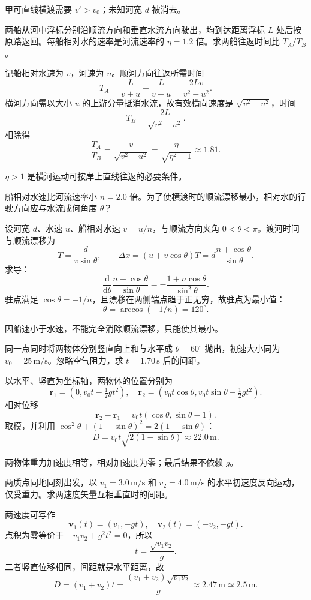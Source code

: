 \excheck
甲可直线横渡需要 $v'>v_0$；未知河宽 $d$ 被消去。


两船从河中浮标分别沿顺流方向和垂直水流方向驶出，均到达距离浮标 $L$ 处后按原路返回。每船相对水的速率是河流速率的 $\eta=1.2$ 倍。求两船往返时间比 $T_A/T_B$。

\exsolution
记船相对水速为 $v$，河速为 $u$。顺河方向往返所需时间
\[
T_A=\frac{L}{v+u}+\frac{L}{v-u}=\frac{2Lv}{v^2-u^2}.
\]
横河方向需以大小 $u$ 的上游分量抵消水流，故有效横向速度是 $\sqrt{v^2-u^2}$，时间
\[
T_B=\frac{2L}{\sqrt{v^2-u^2}}.
\]
相除得
\[
\boxed{\frac{T_A}{T_B}=\frac{v}{\sqrt{v^2-u^2}}
=\frac{\eta}{\sqrt{\eta^2-1}}\approx1.81.}
\]

\excheck
$\eta>1$ 是横河运动可按岸上直线往返的必要条件。


船相对水速比河流速率小 $n=2.0$ 倍。为了使横渡时的顺流漂移最小，相对水的行驶方向应与水流成何角度 $\theta$？

\exsolution
设河宽 $d$、水速 $u$、船相对水速 $v=u/n$，与顺流方向夹角 $0<\theta<\pi$。渡河时间与顺流漂移为
\[
T=\frac d{v\sin\theta},\qquad
\Delta x=(u+v\cos\theta)T
=d\frac{n+\cos\theta}{\sin\theta}.
\]
求导：
\[
\frac{\mathrm d}{\mathrm d\theta}
\frac{n+\cos\theta}{\sin\theta}
=-\frac{1+n\cos\theta}{\sin^2\theta}.
\]
驻点满足 $\cos\theta=-1/n$，且漂移在两侧端点趋于正无穷，故驻点为最小值：
\[
\boxed{\theta=\arccos(-1/n)=120^\circ.}
\]

\excheck
因船速小于水速，不能完全消除顺流漂移，只能使其最小。


同一点同时将两物体分别竖直向上和与水平成 $\theta=60^\circ$ 抛出，初速大小同为 $v_0=25\,\mathrm{m/s}$。忽略空气阻力，求 $t=1.70\,\mathrm s$ 后的间距。

\exsolution
以水平、竖直为坐标轴，两物体的位置分别为
\[
\bm r_1=(0,v_0t-\tfrac12gt^2),\quad
\bm r_2=(v_0t\cos\theta,v_0t\sin\theta-\tfrac12gt^2).
\]
相对位移
\[
\bm r_2-\bm r_1=v_0t(\cos\theta,\sin\theta-1).
\]
取模，并利用 $\cos^2\theta+(1-\sin\theta)^2=2(1-\sin\theta)$：
\[
\boxed{D=v_0t\sqrt{2(1-\sin\theta)}
\approx22.0\,\mathrm m.}
\]

\excheck
两物体重力加速度相等，相对加速度为零；最后结果不依赖 $g$。


两质点同地同刻出发，以 $v_1=3.0\,\mathrm{m/s}$ 和 $v_2=4.0\,\mathrm{m/s}$ 的水平初速度反向运动，仅受重力。求两速度矢量互相垂直时的间距。

\exsolution
两速度可写作
\[
\bm v_1(t)=(v_1,-gt),\quad \bm v_2(t)=(-v_2,-gt).
\]
点积为零等价于 $-v_1v_2+g^2t^2=0$，所以
\[
t=\frac{\sqrt{v_1v_2}}g.
\]
二者竖直位移相同，间距就是水平距离，故
\[
\boxed{D=(v_1+v_2)t
=\frac{(v_1+v_2)\sqrt{v_1v_2}}g
\approx2.47\,\mathrm m\simeq2.5\,\mathrm m.}
\]

